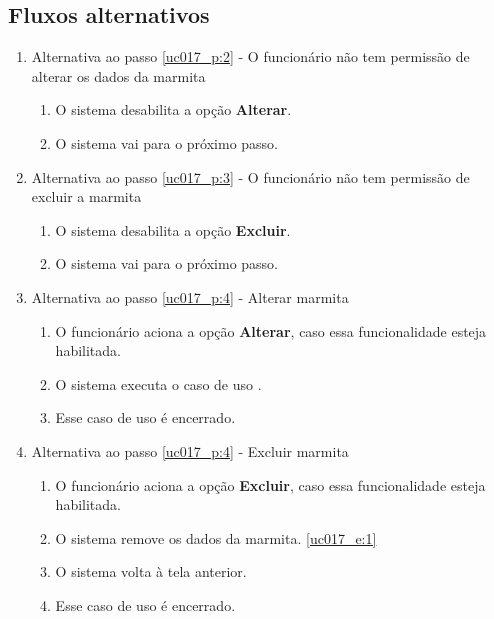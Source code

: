 \subsection{Fluxos alternativos}

\begin{enumerate}[label=A\arabic*]
	\item Alternativa ao passo \ref{uc017_p:2} - O funcionário não tem permissão de alterar os dados da marmita \label{uc017_a:1}
	\begin{enumerate}[label*=.\arabic*]
		\item O sistema desabilita a opção \textbf{Alterar}.
		\item O sistema vai para o próximo passo.
	\end{enumerate}
	
	\item Alternativa ao passo \ref{uc017_p:3} - O funcionário não tem permissão de excluir a marmita \label{uc017_a:2}
	\begin{enumerate}[label*=.\arabic*]
		\item O sistema desabilita a opção \textbf{Excluir}.
		\item O sistema vai para o próximo passo.
	\end{enumerate}
	
	\item Alternativa ao passo \ref{uc017_p:4} - Alterar marmita \label{uc017_a:3}
	\begin{enumerate}[label*=.\arabic*]
		\item O funcionário aciona a opção \textbf{Alterar}, caso essa funcionalidade esteja habilitada.
		\item O sistema executa o caso de uso .
		\item Esse caso de uso é encerrado.
	\end{enumerate}
	
	\item Alternativa ao passo \ref{uc017_p:4} - Excluir marmita \label{uc017_a:4}
	\begin{enumerate}[label*=.\arabic*]
		\item O funcionário aciona a opção \textbf{Excluir}, caso essa funcionalidade esteja habilitada.
		\item O sistema remove os dados da marmita. \label{uc017_a:4:2}\ref{uc017_e:1}
		\item O sistema volta à tela anterior.
		\item Esse caso de uso é encerrado.
	\end{enumerate}
\end{enumerate}

